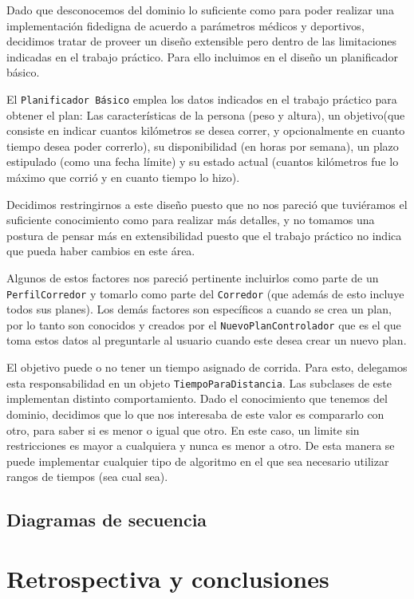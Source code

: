 \documentclass[10pt, a4paper,english,spanish]{article}
\begin{document}
Dado que desconocemos del dominio lo suficiente como para poder realizar una implementación fidedigna de acuerdo a parámetros médicos y deportivos, decidimos tratar de proveer un dise\~no extensible pero dentro de las limitaciones indicadas en el trabajo práctico. Para ello incluimos en el dise\~no un planificador básico.

El \texttt{Planificador Básico} emplea los datos indicados en el trabajo práctico para obtener el plan: Las características de la persona (peso y altura), un objetivo(que consiste en indicar cuantos kilómetros se desea correr, y opcionalmente en cuanto tiempo desea poder correrlo), su disponibilidad (en horas por semana), un plazo estipulado (como una fecha límite) y su estado actual (cuantos kilómetros fue lo máximo que corrió y en cuanto tiempo lo hizo).

Decidimos restringirnos a este diseño puesto que no nos pareció que tuviéramos el suficiente conocimiento como para realizar más detalles, y no tomamos una postura de pensar más en extensibilidad puesto que el trabajo práctico no indica que pueda haber cambios en este área.

Algunos de estos factores nos pareció pertinente incluirlos como parte de un \texttt{PerfilCorredor} y tomarlo como parte del \texttt{Corredor} (que además de esto incluye todos sus planes). Los demás factores son específicos a cuando se crea un plan, por lo tanto son conocidos y creados por el \texttt{NuevoPlanControlador} que es el que toma estos datos al preguntarle al usuario cuando este desea crear un nuevo plan.

El objetivo puede o no tener un tiempo asignado de corrida. Para esto, delegamos esta responsabilidad en un objeto \texttt{TiempoParaDistancia}. Las subclases de este implementan distinto comportamiento. Dado el conocimiento que tenemos del dominio, decidimos que lo que nos interesaba de este valor es compararlo con otro, para saber si es menor o igual que otro. En este caso, un limite sin restricciones es mayor a cualquiera y nunca es menor a otro. De esta manera se puede implementar cualquier tipo de algoritmo en el que sea necesario utilizar rangos de tiempos (sea cual sea).

\subsection{Diagramas de secuencia}



\section{Retrospectiva y conclusiones} 
\end{document}
